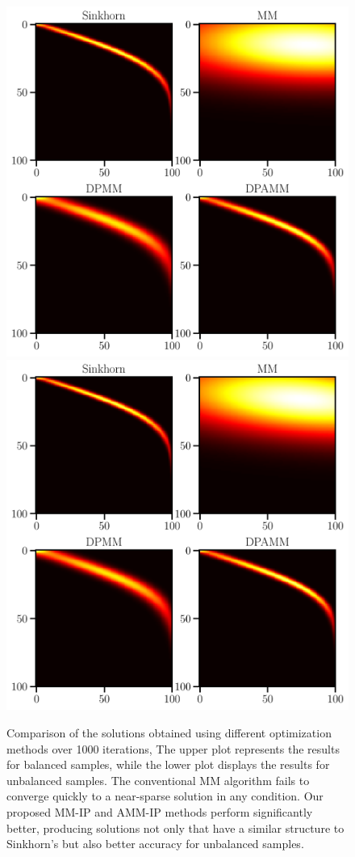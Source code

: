 \documentclass[conference]{IEEEtran}
\begin{document}
\begin{figure}[tp]
\centering
\includegraphics[width = 1.05\linewidth]{pic/ex2}
\centering
\includegraphics[width = 1.05\linewidth]{pic/ex4}
\setlength{\belowcaptionskip}{-30pt}
\caption{Comparison of the solutions obtained using different optimization methods over 1000 iterations, The upper plot represents the results for balanced samples, while the lower plot displays the results for unbalanced samples. The conventional MM algorithm fails to converge quickly to a near-sparse solution in any condition. Our proposed MM-IP and AMM-IP methods perform significantly better, producing solutions not only that have a similar structure to Sinkhorn's but also better accuracy for unbalanced samples.}
\label{Fig:ex2}
\end{figure}
\end{document}
